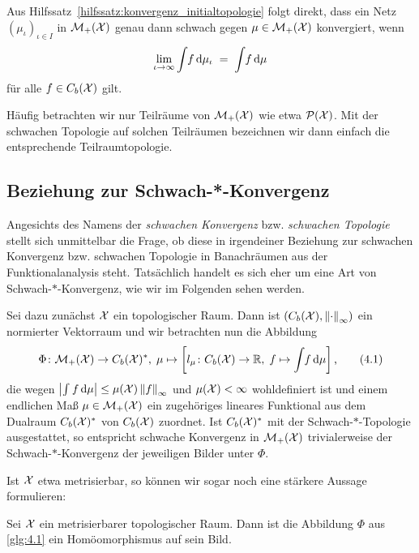 \documentclass[../main/main.tex]{subfiles}
\begin{document}
	\begin{Bemerkung}
		Aus Hilfssatz~\ref{hilfssatz:konvergenz_initialtopologie} folgt direkt, dass ein Netz $(\mu_\iota)_{\iota \in I}$ in $\mathcal{M}_{+}(\mathcal{X})$ genau dann schwach gegen $\mu \in \mathcal{M}_{+}(\mathcal{X})$
		konvergiert, wenn
		\[ \lim_{\iota \to \infty} \int_{} \, f \, \mathrm{d}\mu_\iota \; = \; \int_{} \, f \, \mathrm{d}\mu \]
		für alle $f \in C_b(\mathcal{X})$ gilt.
	\end{Bemerkung}

	Häufig betrachten wir nur Teilräume von $\mathcal{M}_{+}(\mathcal{X})$ wie etwa $\mathcal{P}(\mathcal{X})$. Mit der schwachen Topologie auf solchen Teilräumen bezeichnen wir 
	dann einfach die entsprechende Teilraumtopologie.

	\subsection{Beziehung zur Schwach-*-Konvergenz}
	\label{subsec:beziehung_schwach-stern-konvergenz}
	
	Angesichts des Namens der \emph{schwachen Konvergenz} bzw. \emph{schwachen Topologie} stellt sich unmittelbar die Frage, ob diese in irgendeiner Beziehung zur schwachen Konvergenz bzw. schwachen Topologie in Banachräumen aus der 
	Funktionalanalysis steht. Tatsächlich handelt es sich eher um eine Art von Schwach-$\ast$-Konvergenz, wie wir im Folgenden sehen werden. 
	
	Sei dazu zunächst $\mathcal{X}$ ein topologischer Raum. Dann ist $(C_b(\mathcal{X}), \left\lVert\cdot\right\rVert_\infty)$ ein normierter Vektorraum und wir betrachten nun die Abbildung
	\[\Phi \colon \mathcal{M}_{+}(\mathcal{X}) \to C_b(\mathcal{X})^\ast, \; \mu \mapsto \left[l_\mu \colon C_b(\mathcal{X}) \to \mathbb{R}, \; f \mapsto \int_{} \, f \, \mathrm{d}\mu \right]  \text{,} \label{glg:4.1} \tag{4.1}\]
	die wegen $\left| \int_{} \, f \, \mathrm{d}\mu \right| \leq \mu(\mathcal{X}) \left\lVert f\right\rVert_\infty$ und $\mu(\mathcal{X}) < \infty$ wohldefiniert ist 
	und einem endlichen Maß $\mu \in \mathcal{M}_{+}(\mathcal{X})$ ein zugehöriges lineares Funktional aus dem Dualraum $C_b(\mathcal{X})^\ast$ von $C_b(\mathcal{X})$ zuordnet. 
	Ist $C_b(\mathcal{X})^\ast$ mit der 
	Schwach-$\ast$-Topologie ausgestattet, so entspricht schwache Konvergenz in $\mathcal{M}_{+}(\mathcal{X})$ trivialerweise der 
	Schwach-$\ast$-Konvergenz der jeweiligen Bilder unter $\Phi$.
	
	Ist $\mathcal{X}$ etwa metrisierbar, so können wir sogar noch eine stärkere Aussage formulieren:
	
	\begin{Hilfssatz}
		Sei $\mathcal{X}$ ein metrisierbarer topologischer Raum. Dann ist die Abbildung $\Phi$ aus \eqref{glg:4.1} ein Homöomorphismus auf sein Bild.
	\end{Hilfssatz}
\end{document}
